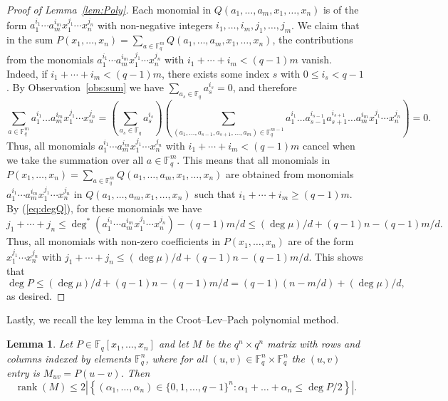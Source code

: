 \documentclass[11pt, reqno]{amsart}
\newtheorem{lemma}[theorem]{Lemma}
\theoremstyle{definition}
\newcommand{\F}{\mathbb{F}}
\DeclareMathOperator{\rank}{rank}
\begin{document}
\begin{proof}[Proof of Lemma~\ref{lem:Poly}]
Each monomial in $Q(a_1, \ldots, a_m, x_1, \ldots, x_n)$ is of the form $a_1^{i_1} \cdots a_m^{i_m}x_1^{j_1} \cdots x_n^{j_n}$ with non-negative integers $i_1, \ldots, i_m, j_1,\ldots,j_m$. We claim that in the sum $P(x_1, \ldots, x_n) = \sum_{a \in \F_q^m}  Q(a_1, \ldots, a_m,x_1, \ldots, x_n)$, the contributions from the monomials $a_1^{i_1} \cdots a_m^{i_m}x_1^{j_1} \cdots x_n^{j_n}$ with $i_1 + \cdots + i_m < (q-1)m$ vanish. Indeed, if $i_1 + \cdots + i_m < (q-1)m$, there exists some index $s$ with $0\le i_s < q-1$. By Observation~\ref{obs:sum} we have $\sum_{a_{s} \in \F_q} a_{s}^{i_s} = 0$, and therefore
\[ \sum_{a \in \F_q^m} a_1^{i_1} \ldots a_m^{i_m}x_1^{j_1} \cdots x_n^{j_n}  = \left(\sum_{a_{s} \in \F_q} a_{s}^{i_s} \right) \left( \sum_{(a_1, \ldots, a_{s-1}, a_{s+1}, \ldots, a_m)\in \F_q^{m-1}} a_1^{i_1} \ldots a_{s-1}^{i_{s-1}} a_{s+1}^{i_{s+1}} \ldots a_m^{i_m} x_1^{j_1} \cdots x_n^{j_n}\right) = 0. \]
Thus, all monomials $a_1^{i_1} \cdots a_m^{i_m}x_1^{j_1} \cdots x_n^{j_n}$ with $i_1 + \cdots + i_m < (q-1)m$ cancel when we take the summation over all $a\in \F_q^m$. This means that all monomials in $P(x_1, \ldots, x_n) = \sum_{a \in \F_q^m}  Q(a_1, \ldots, a_m,x_1, \ldots, x_n)$ are obtained from monomials $a_1^{i_1} \cdots a_m^{i_m}x_1^{j_1} \cdots x_n^{j_n}$ in $Q(a_1, \ldots, a_m, x_1, \ldots, x_n)$ such that $i_1+\cdots + i_m \geq (q-1)m$. By (\ref{eq:degQ}), for these monomials we have
\[j_1 + \cdots +j_n \leq \deg^*(a_1^{i_1} \cdots a_m^{i_m}x_1^{j_1} \cdots x_n^{j_n})- (q-1)m/d\le  (\deg \mu)/d + (q-1)n - (q-1)m/d.\]
Thus, all monomials with non-zero coefficients in $P(x_1,\dots,x_n)$ are of the form $x_1^{j_1} \cdots x_n^{j_n}$ with $j_1 + \cdots +j_n\le (\deg \mu)/d + (q-1)n - (q-1)m/d$. This shows that
\[\deg P \leq  (\deg \mu)/d +(q-1)n - (q-1)m/d = (q-1)(n-m/d) + (\deg \mu)/d,\]
as desired.
\end{proof}

Lastly, we recall the key lemma in the Croot--Lev--Pach \cite{CLP17} polynomial method.

\begin{lemma}\label{lem:CLP}
Let $P \in \F_q[x_1, \ldots, x_n]$ and let $M$ be the $q^n \times q^n$ matrix with rows and columns indexed by elements $\F_q^n$, where for all $(u,v)\in \F_q^n\times\F_q^n$ the $(u,v)$ entry is $M_{uv} = P(u -v)$. Then 
\[ \rank(M) \leq 2 \left| \left \{ (\alpha_1,\ldots, \alpha_n)\in \{0, 1, \ldots, q-1 \}^n:  \alpha_1 + \ldots + \alpha_n \leq \deg P/2 \right \}\right|. \]
\end{lemma}
\end{document}
